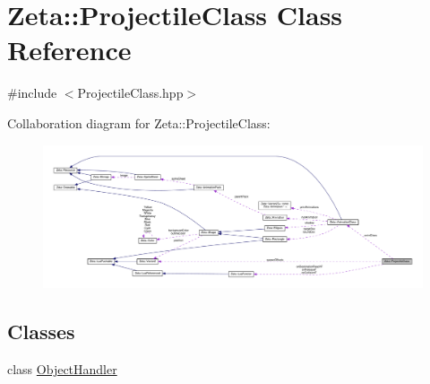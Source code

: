 \hypertarget{classZeta_1_1ProjectileClass}{\section{Zeta\+:\+:Projectile\+Class Class Reference}
\label{classZeta_1_1ProjectileClass}
}


{\ttfamily \#include $<$Projectile\+Class.\+hpp$>$}



Collaboration diagram for Zeta\+:\+:Projectile\+Class\+:
\nopagebreak
\begin{figure}[H]
\begin{center}
\leavevmode
\includegraphics[width=350pt]{classZeta_1_1ProjectileClass__coll__graph}
\end{center}
\end{figure}
\subsection*{Classes}
\begin{DoxyCompactItemize}
\item 
class \hyperlink{classZeta_1_1ProjectileClass_1_1ObjectHandler}{Object\+Handler}
\end{DoxyCompactItemize}
